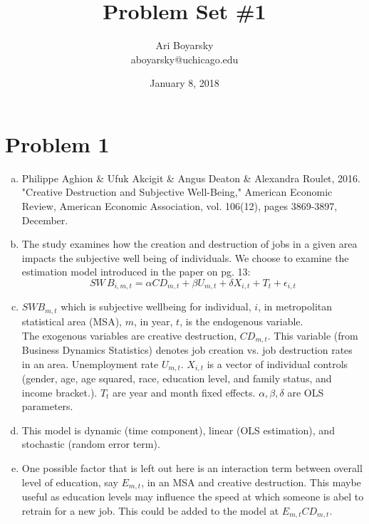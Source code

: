 \documentclass[dvips,12pt]{article}
\begin{document}

\title{Problem Set \#1}
\author{Ari Boyarsky \\ aboyarsky@uchicago.edu}
\date{January 8, 2018}


\maketitle


\section*{Problem 1}
\begin{enumerate}[a.]
	\item Philippe Aghion \& Ufuk Akcigit \& Angus Deaton \& Alexandra Roulet, 2016. "Creative Destruction and Subjective Well-Being," American Economic Review, American Economic Association, vol. 106(12), pages 3869-3897, December.

	\item The study examines how the creation and destruction of jobs in a given area impacts the subjective well being of individuals. We choose to examine the estimation model introduced in the paper on pg. 13:
	$$SW\,B_{i,m,t} = \alpha C D_{m,t} + \beta U_{m,t} + \delta X_{i,t} + T_t + \epsilon_{i,t}$$

	\item $SW B_{m,t}$ which is subjective wellbeing for individual, $i$, in metropolitan statistical area (MSA), $m$, in year, $t$, is the endogenous variable.
	\vspace{10pt} 
	\\ The exogenous variables are creative destruction, $CD_{m,t}$. This variable (from Business Dynamics Statistics) denotes job creation vs. job destruction rates in an area. Unemployment rate $U_{m,t}$. $X_{i,t}$ is a vector of individual controls (gender, age, age squared, race, education level, and family status, and income bracket.). $T_t$ are year and month fixed effects. $\alpha, \beta, \delta$ are OLS parameters.

	\item This model is dynamic (time component), linear (OLS estimation), and stochastic (random error term).

	\item One possible factor that is left out here is an interaction term between overall level of education, say $E_{m,t}$, in an MSA and creative destruction. This maybe useful as education levels may influence the speed at which someone is abel to retrain for a new job. This could be added to the model at $E_{m,t}C D_{m,t}$.
\end{enumerate}
\end{document}
